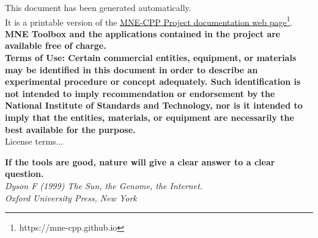\documentclass[12pt, twoside]{article}
\newcommand{\versionnumber}{0.1.9}
\begin{document}
\begin{titlepage}
\noindent \normalsize This document has been generated automatically. \\
It is a printable version of the \href{https://mne-cpp.github.io}{\underline{MNE-CPP Project documentation web page}}\footnote{https://mne-cpp.github.io}.
\vfill
\noindent\normalsize \textbf{MNE Toolbox and the applications contained in the project are available free of charge.} \\
\vfill	
\noindent
\footnotesize \noindent \textbf{Terms of Use: Certain commercial entities, equipment, or materials may be identified in this document in order to describe an experimental procedure or concept adequately. Such identification is not intended to imply recommendation or endorsement by the National Institute of Standards and Technology, nor is it intended to imply that the entities, materials, or equipment are necessarily the best available for the purpose.}\\ 
\vfill
\footnotesize License terms...
\vfill
\end{titlepage}


\begin{titlepage}
\begin{flushright}
\vspace*{\fill}
\noindent\normalsize\textbf{If the tools are good, nature will give a clear answer to a clear question.} \\
\textit{Dyson F (1999) The Sun, the Genome, the Internet. \\Oxford University Press, New York} \\
\vspace*{\fill}
\end{flushright}
\end{titlepage}


\fancyhf{}
\fancyhead[CE]{Version: \versionnumber}
\fancyhead[RE]{\today}
\fancyhead[LO]{\nouppercase\leftmark}
\fancyhead[RO]{\nouppercase\rightmark}
\renewcommand{\subsectionmark}[1]{\markright{\thesubsection\ #1}}
\setlength\headheight{26pt}
\fancyheadoffset{0cm} 
\end{document}
